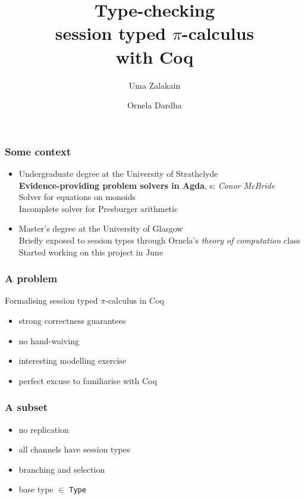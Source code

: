 \documentclass{beamer}
\title{
    Type-checking \\
    session typed $\pi$-calculus \\
    with Coq
}
\author{Uma Zalakain \and Ornela Dardha}
\institute{University of Glasgow}
\date{}
\begin{document}
\begin{frame}
    \titlepage
\end{frame}

\begin{frame}
    \frametitle{Some context}
    \begin{itemize}
        \item Undergraduate degree at the University of Strathclyde\\
            {\small
            \textbf{Evidence-providing problem solvers in Agda},
            s: \textit{Conor McBride} \\
            \scriptsize Solver for equations on monoids\\
            Incomplete solver for Presburger arithmetic \\
            }
        \item Master's degree at the University of Glasgow\\
            {\scriptsize
            Briefly exposed to session types through Ornela's \textit{theory of
            computation} class\\
            Started working on this project in June\\
            }
    \end{itemize}
\end{frame}

\begin{frame}
    \frametitle{A problem}
    \begin{block}{Formalising session typed $\pi$-calculus in Coq}
        \begin{itemize}
            \item strong correctness guarantees
            \item no hand-waiving
            \item interesting modelling exercise
            \item perfect excuse to familiarise with Coq
        \end{itemize}
    \end{block}
\end{frame}

\begin{frame}
    \frametitle{A subset}
    \begin{itemize}
        \item no replication
        \item all channels have session types
        \item branching and selection
        \item base type $\in$ \texttt{Type}
    \end{itemize}
\end{frame}
\end{document}
